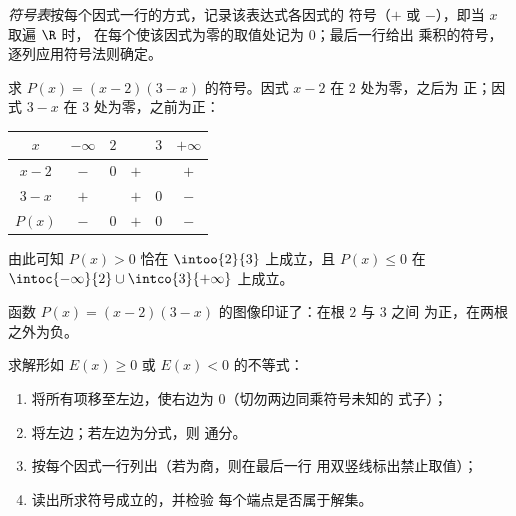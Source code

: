 \begin{definition}[符号表]\label{def:g10:algebra:signtable}
\emph{符号表}按每个因式一行的方式，记录该表达式各因式的
符号（$+$ 或 $-$），即当 $x$ 取遍 $\R$ 时，
在每个使该因式为零的取值处记为 $0$；最后一行给出
乘积的符号，逐列应用符号法则确定。
\end{definition}

\begin{example}\label{ex:g10:algebra:signtable}
求 $P(x) = (x - 2)(3 - x)$ 的符号。因式 $x - 2$ 在 $2$ 处为零，之后为
正；因式 $3 - x$ 在 $3$ 处为零，之前为正：
\begin{center}
\renewcommand{\arraystretch}{1.3}
\begin{tabular}{c|ccccc}
$x$ & $-\infty$ \quad & $2$ & & $3$ & \quad $+\infty$ \\
\hline
$x - 2$ & $-$ & $0$ & $+$ & & $+$ \\
$3 - x$ & $+$ & & $+$ & $0$ & $-$ \\
\hline
$P(x)$ & $-$ & $0$ & $+$ & $0$ & $-$ \\
\end{tabular}
\end{center}
由此可知 $P(x) > 0$ 恰在 $\intoo{2}{3}$ 上成立，且 $P(x) \leq 0$ 在
$\intoc{-\infty}{2} \cup \intco{3}{+\infty}$ 上成立。
\end{example}

\begin{omfigure}

{\small 函数 $P(x) = (x-2)(3-x)$ 的图像印证了：在根 $2$ 与 $3$ 之间
为正，在两根之外为负。}
\end{omfigure}

\begin{method}[用符号表解不等式]\label{met:g10:algebra:signtable}
求解形如 $E(x) \geq 0$ 或 $E(x) < 0$ 的不等式：
\begin{enumerate}
  \item 将所有项移至左边，使右边为
        $0$（切勿两边同乘符号未知的
        式子）；
  \item 将左边；若左边为分式，则
        通分。
  \item 按每个因式一行列出（若为商，则在最后一行
        用双竖线标出禁止取值）；
  \item 读出所求符号成立的，并检验
        每个端点是否属于解集。
\end{enumerate}
\end{method}

